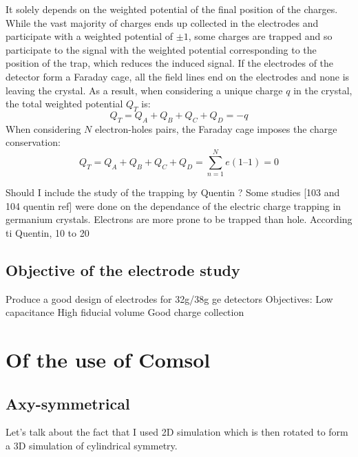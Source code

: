 It solely depends on the weighted potential of the final position of the charges. While the vast majority of charges ends up collected in the electrodes and participate with a weighted potential of $\pm 1$, some charges are trapped and so participate to the signal with the weighted potential corresponding to the position of the trap, which reduces the induced signal.
If the electrodes of the detector form a Faraday cage, all the field lines end on the electrodes and none is leaving the crystal. As a result, when considering a unique charge $q$ in the crystal, the total weighted potential $Q_T$ is:
\begin{equation}
\label{eq:charge-conservation}
Q_T = Q_A + Q_B + Q_C + Q_D = -q
\end{equation}
When considering $N$ electron-holes pairs, the Faraday cage imposes the charge conservation:
\begin{equation}
\label{eq:charge-conservation}
Q_T = Q_A + Q_B + Q_C + Q_D = \sum_{n=1}^{N} e (1 – 1) = 0
\end{equation}

Should I include the study of the trapping by Quentin ? Some studies [103 and 104 quentin ref] were done on the dependance of the electric charge  trapping in germanium crystals. Electrons are more prone to be trapped than hole. According ti Quentin, 10 to 20%



\subsection{Objective of the electrode study}

Produce a good design of electrodes for 32g/38g ge detectors
Objectives:
Low capacitance
High fiducial volume
Good charge collection


\section{Of the use of Comsol}

\subsection{Axy-symmetrical} 

Let's talk about the fact that I used 2D simulation which is then rotated to form a 3D simulation of cylindrical symmetry.

